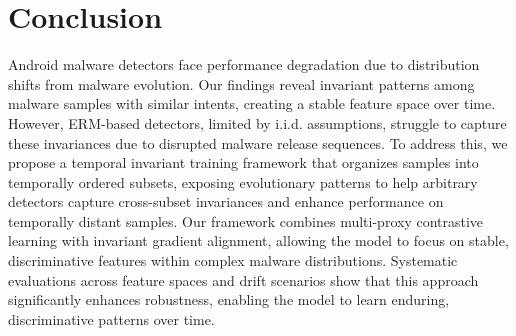\section{Conclusion}
Android malware detectors face performance degradation due to distribution shifts from malware evolution. Our findings reveal invariant patterns among malware samples with similar intents, creating a stable feature space over time. However, ERM-based detectors, limited by i.i.d. assumptions, struggle to capture these invariances due to disrupted malware release sequences. To address this, we propose a temporal invariant training framework that organizes samples into temporally ordered subsets, exposing evolutionary patterns to help arbitrary detectors capture cross-subset invariances and enhance performance on temporally distant samples. Our framework combines multi-proxy contrastive learning with invariant gradient alignment, allowing the model to focus on stable, discriminative features within complex malware distributions. Systematic evaluations across feature spaces and drift scenarios show that this approach significantly enhances robustness, enabling the model to learn enduring, discriminative patterns over time.
